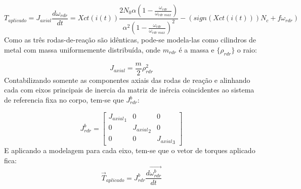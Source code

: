 \begin{equation}
T_{aplicado}=J_{axial}\frac{d\omega_{rdr}}{dt}=Xct(i(t))\frac{2N_0\alpha\left (1-\frac{\omega_{rdr}}{\omega_{rdr\;max}} \right )}{\alpha^2\left (1-\frac{\omega_{rdr}}{\omega_{rdr\;max}} \right )^2}-\left (sign(Xct(i(t)))N_c+f\omega_{rdr}\right )
\end{equation}
Como as três rodas-de-reação são idênticas, pode-se modela-las como cilindros de metal com massa uniformemente distribuída, onde $m_{rdr}$ é a massa e $\{\rho_{rdr}\}$ o raio:

\begin{equation}{J_{axial}}=\frac{m}{2}\rho^2_{rdr}\end{equation}Contabilizando somente as componentes axiais das rodas de reação e alinhando cada com eixos principais de inercia da matriz de inércia coincidentes ao sistema de referencia fixa no corpo, tem-se que   $J^b_{rdr}$:

\begin{equation}J^b_{rdr} =\begin{bmatrix}
{J_{axial}}_1&0&0 \\0 &{J_{axial}}_2&0 \\ 0&0&{J_{axial}}_3
\end{bmatrix}\end{equation}E aplicando a modelagem para cada eixo, tem-se que o vetor de torques aplicado fica:
\begin{equation}
\vec{T}_{aplicado}=J^b_{rdr}\frac{d\vec{\omega^b_{rdr}}}{dt}
\end{equation}


